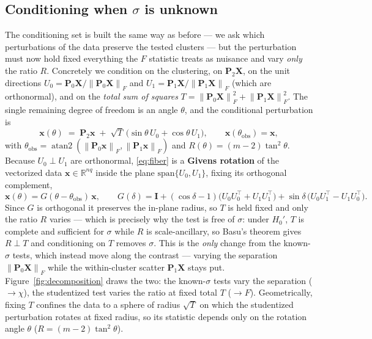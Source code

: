 \documentclass[11pt]{article}
\newcommand{\R}{\mathbb{R}}
\newcommand{\X}{\mathbf{X}}
\newcommand{\x}{\mathbf{x}}
\newcommand{\Pp}{\mathbf{P}}
\newcommand{\Fnorm}[1]{\left\lVert #1 \right\rVert_F}
\begin{document}
\subsection{Conditioning when $\sigma$ is unknown}
The conditioning set is built the same way as before --- we ask which
perturbations of the data preserve the tested clusters --- but the perturbation
must now hold fixed everything the $F$ statistic treats as nuisance and vary
\emph{only} the ratio $R$. Concretely we condition on the clustering, on
$\Pp_2\X$, on the unit directions $U_0=\Pp_0\X/\Fnorm{\Pp_0\X}$ and
$U_1=\Pp_1\X/\Fnorm{\Pp_1\X}$ (which are orthonormal), and on the
\emph{total sum of squares} $T = \Fnorm{\Pp_0\X}^2+\Fnorm{\Pp_1\X}^2$. The single
remaining degree of freedom is an angle $\theta$, and the conditional
perturbation is
\begin{equation}
  \x(\theta) \;=\; \Pp_2\x \;+\; \sqrt{T}\,\big(\sin\theta\,U_0 + \cos\theta\,U_1\big),
  \qquad \x(\theta_{\mathrm{obs}})=\x,
  \label{eq:fiber}
\end{equation}
with $\theta_{\mathrm{obs}}=\operatorname{atan2}(\Fnorm{\Pp_0\x},\Fnorm{\Pp_1\x})$
and $R(\theta)=(m-2)\tan^2\theta$. Because $U_0\perp U_1$ are orthonormal,
\eqref{eq:fiber} is a \textbf{Givens rotation} of the vectorized data
$\x\in\R^{nq}$ inside the plane $\mathrm{span}\{U_0,U_1\}$, fixing its orthogonal
complement,
\begin{equation}
  \x(\theta) = G(\theta-\theta_{\mathrm{obs}})\,\x,\qquad
  G(\delta) = \mathbf I + (\cos\delta-1)\big(U_0U_0^\top+U_1U_1^\top\big)
                       + \sin\delta\,\big(U_0U_1^\top-U_1U_0^\top\big).
\end{equation}
Since $G$ is orthogonal it preserves the in-plane radius, so $T$ is held fixed and
only the ratio $R$ varies --- which is precisely why the test is free of $\sigma$:
under $H_0'$, $T$ is complete and sufficient for $\sigma$ while $R$ is
scale-ancillary, so Basu's theorem gives $R\perp T$ and conditioning on $T$
removes $\sigma$. This is the \emph{only} change from the known-$\sigma$ tests,
which instead move along the contrast --- varying the separation
$\Fnorm{\Pp_0\X}$ while the within-cluster scatter $\Pp_1\X$ stays put.
Figure~\ref{fig:decomposition} draws the two: the known-$\sigma$ tests vary the
separation ($\to\chi$), the studentized test varies the ratio at fixed total
$T$ ($\to F$). Geometrically, fixing $T$ confines the data to a sphere of
radius $\sqrt T$ on which the studentized perturbation rotates at fixed radius,
so its statistic depends only on the rotation angle $\theta$
($R=(m-2)\tan^2\theta$).
\end{document}
